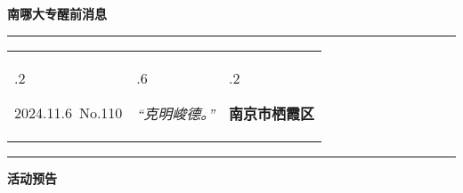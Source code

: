 \documentclass[letterpaper, 12pt]{article}
\begin{document}
\begin{center}
    \Huge\textbf{南哪大专醒前消息}
\end{center}
\vspace{4mm}
\hrule
\renewcommand\tabularxcolumn[1]{m{#1}}
\begin{tabularx}{\textwidth}{>{\hsize.2\hsize}X>{\hsize.6\hsize}X>{\hsize.2\hsize}X}
    \begin{flushleft}
        2024.11.6\, No.110
    \end{flushleft}
    &
    \begin{center}
        \textit{“克明峻德。”}
    \end{center}
    &
    \begin{flushright}
        \textbf{南京市栖霞区}
    \end{flushright}
\end{tabularx}
\vspace{-3.5mm}
\hrule
\vspace{4mm}
\centerline{\huge\textbf{活动预告}}
\end{document}
